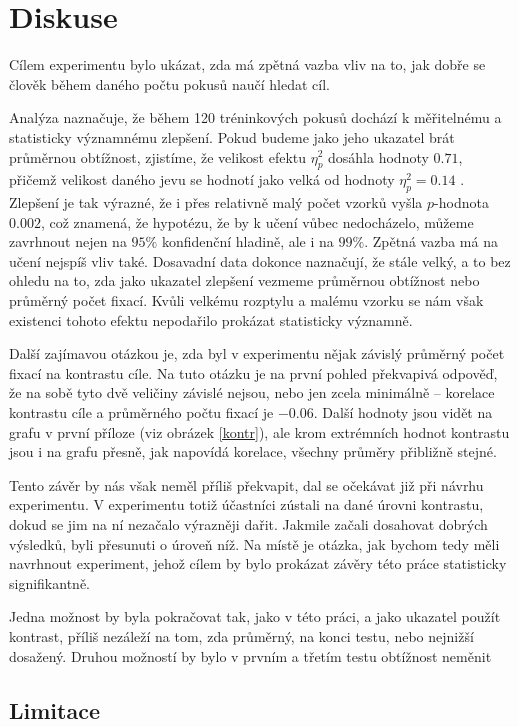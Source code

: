 \chapter{Diskuse}

Cílem experimentu bylo ukázat, zda má zpětná vazba vliv na to, jak dobře se
člověk během daného počtu pokusů naučí hledat cíl.

Analýza naznačuje, že během 120 tréninkových pokusů dochází k měřitelnému a
statisticky významnému zlepšení. Pokud budeme jako jeho ukazatel brát průměrnou
obtížnost, zjistíme, že velikost efektu $\eta^2_p$ dosáhla hodnoty $0.71$,
přičemž velikost daného jevu se hodnotí jako velká od hodnoty $\eta^2_p=0.14$
\citep{Cohen}. Zlepšení je tak výrazné, že i přes relativně malý počet vzorků
vyšla $p$-hodnota $0.002$, což znamená, že hypotézu, že by k učení vůbec
nedocházelo, můžeme zavrhnout nejen na $95\%$ konfidenční hladině, ale i na
$99\%$. Zpětná vazba má na učení nejspíš vliv také. Dosavadní data dokonce
naznačují, že stále velký, a to bez ohledu na to, zda jako ukazatel zlepšení
vezmeme průměrnou obtížnost nebo průměrný počet fixací. Kvůli velkému rozptylu
a malému vzorku se nám však existenci tohoto efektu nepodařilo prokázat
statisticky významně.

Další zajímavou otázkou je, zda byl v experimentu nějak závislý průměrný počet
fixací na kontrastu cíle. Na tuto otázku je na první pohled překvapivá odpověď,
že na sobě tyto dvě veličiny závislé nejsou, nebo jen zcela minimálně --
korelace kontrastu cíle a průměrného počtu fixací je $-0.06$. Další hodnoty
jsou vidět na grafu v první příloze (viz obrázek \ref{kontr}), ale krom
extrémních hodnot kontrastu jsou i na grafu přesně, jak napovídá korelace,
všechny průměry přibližně stejné.

Tento závěr by nás však neměl příliš překvapit, dal se očekávat již při návrhu
experimentu. V experimentu totiž účastníci zústali na dané úrovni kontrastu,
dokud se jim na ní nezačalo výrazněji dařit. Jakmile začali dosahovat dobrých
výsledků, byli přesunuti o úroveň níž. Na místě je otázka, jak bychom tedy měli
navrhnout experiment, jehož cílem by bylo prokázat závěry této práce
statisticky signifikantně.

Jedna možnost by byla pokračovat tak, jako v této
práci, a jako ukazatel použít kontrast, příliš nezáleží na tom, zda průměrný, na konci testu, nebo nejnižší dosažený.    
Druhou možností by bylo v prvním a třetím testu obtížnost neměnit


\section{Limitace}

